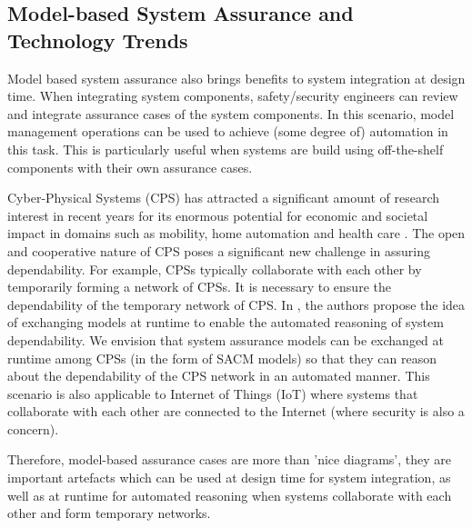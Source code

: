 \subsection{Model-based System Assurance and Technology Trends}
Model based system assurance also brings benefits to system integration at design time. When integrating system components, safety/security engineers can review and integrate assurance cases of the system components. In this scenario, model management operations can be used to achieve (some degree of) automation in this task. This is particularly useful when systems are build using off-the-shelf components with their own assurance cases.

Cyber-Physical Systems (CPS) has attracted a significant amount of research interest in recent years for its enormous potential for economic and societal impact in domains such as mobility, home automation and health care \cite{wei2017deis}. 
The open and cooperative nature of CPS poses a significant new challenge in assuring dependability. 
For example, CPSs typically collaborate with each other by temporarily forming a network of CPSs. 
It is necessary to ensure the dependability of the temporary network of CPS.
In \cite{Schneider2015}, the authors propose the idea of exchanging models at runtime to enable the automated reasoning of system dependability. 
We envision that system assurance models can be exchanged at runtime among CPSs (in the form of SACM models) so that they can reason about the dependability of the CPS network in an automated manner. 
This scenario is also applicable to Internet of Things (IoT) where systems that collaborate with each other are connected to the Internet (where security is also a concern). 

Therefore, model-based assurance cases are more than 'nice diagrams', they are important artefacts which can be used at design time for system integration, as well as at runtime for automated reasoning when systems collaborate with each other and form temporary networks. 